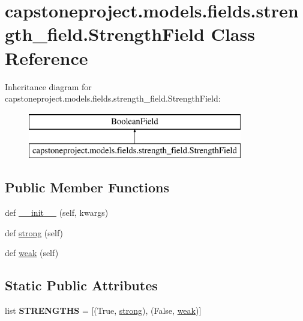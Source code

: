 \hypertarget{classcapstoneproject_1_1models_1_1fields_1_1strength__field_1_1_strength_field}{}\section{capstoneproject.\+models.\+fields.\+strength\+\_\+field.\+Strength\+Field Class Reference}
\label{classcapstoneproject_1_1models_1_1fields_1_1strength__field_1_1_strength_field}
Inheritance diagram for capstoneproject.\+models.\+fields.\+strength\+\_\+field.\+Strength\+Field\+:\begin{figure}[H]
\begin{center}
\leavevmode
\includegraphics[height=2.000000cm]{classcapstoneproject_1_1models_1_1fields_1_1strength__field_1_1_strength_field}
\end{center}
\end{figure}
\subsection*{Public Member Functions}
\begin{DoxyCompactItemize}
\item 
def \mbox{\hyperlink{classcapstoneproject_1_1models_1_1fields_1_1strength__field_1_1_strength_field_a41f7b36a4e7a0f4c4af30c479eee6d6a}{\+\_\+\+\_\+init\+\_\+\+\_\+}} (self, kwargs)
\item 
def \mbox{\hyperlink{classcapstoneproject_1_1models_1_1fields_1_1strength__field_1_1_strength_field_a8b4be62d54e2c32edc662ebd942c2491}{strong}} (self)
\item 
def \mbox{\hyperlink{classcapstoneproject_1_1models_1_1fields_1_1strength__field_1_1_strength_field_af5b40866e3b47e5c7cca9b4761d6e052}{weak}} (self)
\end{DoxyCompactItemize}
\subsection*{Static Public Attributes}
\begin{DoxyCompactItemize}
\item 
\mbox{\label{classcapstoneproject_1_1models_1_1fields_1_1strength__field_1_1_strength_field_af4f9c8fc1f5b7d193c7f5d2290a3f8d6}} 
list {\bfseries S\+T\+R\+E\+N\+G\+T\+HS} = \mbox{[}(True, \textquotesingle{}\mbox{\hyperlink{classcapstoneproject_1_1models_1_1fields_1_1strength__field_1_1_strength_field_a8b4be62d54e2c32edc662ebd942c2491}{strong}}\textquotesingle{}), (False, \textquotesingle{}\mbox{\hyperlink{classcapstoneproject_1_1models_1_1fields_1_1strength__field_1_1_strength_field_af5b40866e3b47e5c7cca9b4761d6e052}{weak}}\textquotesingle{})\mbox{]}
\end{DoxyCompactItemize}


